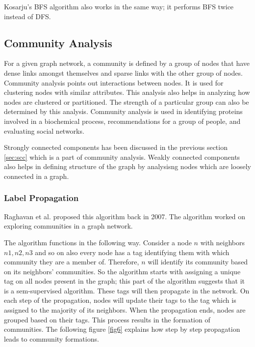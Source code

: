 \documentclass[journal,twoside,web]{ieeecolor}
\begin{document}
Kosarju's BFS algorithm also works in the same way; it performs BFS twice instead of DFS.

\subsection{Community Analysis}
For a given graph network, a community is defined by a group of nodes that have dense links amongst themselves and sparse links with the other group of nodes. Community analysis points out interactions between nodes. It is used for clustering nodes with similar attributes. This analysis also helps in analyzing how nodes are clustered or partitioned. The strength of a particular group can also be determined by this analysis. Community analysis is used in identifying proteins involved in a biochemical process, recommendations for a group of people, and evaluating social networks. 

Strongly connected components has been discussed in the previous section \ref{sec:scc} which is a part of community analysis. Weakly connected components also helps in defining structure of the graph by analysisng nodes which are loosely connected in a graph.

\subsubsection{Label Propagation}
Raghavan et al. proposed this algorithm back in 2007\cite{16}. The algorithm worked on exploring communities in a graph network. 

The algorithm functions in the following way. Consider a node $n$ with neighbors $n1, n2, n3$ and so on also every node has a tag identifying them with which community they are a member of. Therefore, $n$ will identify its community based on its neighbors' communities. So the algorithm starts with assigning a unique tag on all nodes present in the graph; this part of the algorithm suggests that it is a sem-supervised algorithm. These tags will then propagate in the network. On each step of the propagation, nodes will update their tags to the tag which is assigned to the majority of its neighbors. When the propagation ends, nodes are grouped based on their tags. This process results in the formation of communities. The following figure \ref{fig6} explains how step by step propagation leads to community formations.
\end{document}
